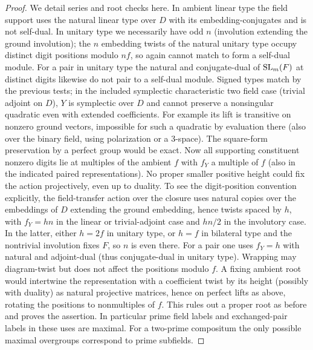 \begin{proof}
We detail series and root checks here. In ambient linear type the field support uses the natural linear type over \(D\) with its embedding-conjugates and is not self-dual. In unitary type we necessarily have odd \(n\) (involution extending the ground involution); the \(n\) embedding twists of the natural unitary type occupy distinct digit positions modulo \(n f\), so again cannot match to form a self-dual module. For a pair in unitary type the natural and conjugate-dual of \({\rm SL}_m(F)\) at distinct digits likewise do not pair to a self-dual module. Signed types match by the previous tests; in the included symplectic characteristic two field case (trivial adjoint on \(D\)), \(Y\) is symplectic over \(D\) and cannot preserve a nonsingular quadratic even with extended coefficients. For example its lift is transitive on nonzero ground vectors, impossible for such a quadratic by evaluation there (also over the binary field, using polarization or a 3-space). The square-form preservation by a perfect group would be exact. Now all supporting constituent nonzero digits lie at multiples of the ambient \(f\) with \(f_Y\) a multiple of \(f\) (also in the indicated paired representations). No proper smaller positive height could fix the action projectively, even up to duality. To see the digit-position convention explicitly, the field-transfer action over the closure uses natural copies over the embeddings of \(D\) extending the ground embedding, hence twists spaced by \(h\), with \(f_Y=hn\) in the linear or trivial-adjoint case and \(hn/2\) in the involutory case. In the latter, either \(h=2f\) in unitary type, or \(h=f\) in bilateral type and the nontrivial involution fixes \(F\), so \(n\) is even there. For a pair one uses \(f_Y=h\) with natural and adjoint-dual (thus conjugate-dual in unitary type). Wrapping may diagram-twist but does not affect the positions modulo \(f\). A fixing ambient root would intertwine the representation with a coefficient twist by its height (possibly with duality) as natural projective matrices, hence on perfect lifts as above, rotating the positions to nonmultiples of \(f\). This rules out a proper root as before and proves the assertion. In particular prime field labels and exchanged-pair labels in these uses are maximal. For a two-prime compositum the only possible maximal overgroups correspond to prime subfields.\qedhere

\end{proof}

